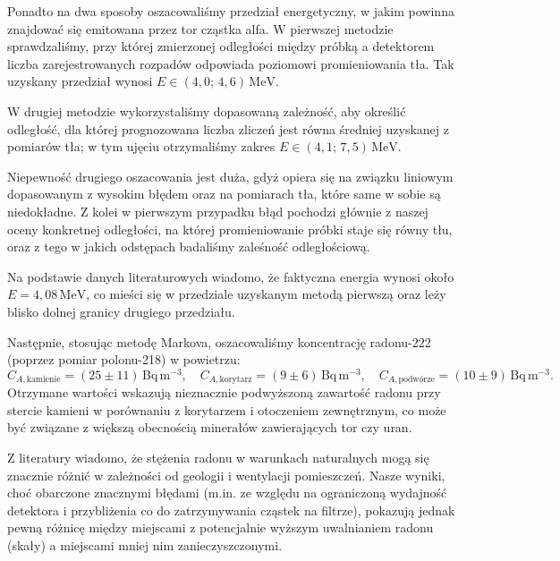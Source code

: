 \documentclass[12pt]{article}
\begin{document}
Ponadto na dwa sposoby oszacowaliśmy przedział energetyczny, w jakim powinna znajdować się emitowana przez tor cząstka alfa. W pierwszej metodzie sprawdzaliśmy, przy której zmierzonej odległości między próbką a detektorem liczba zarejestrowanych rozpadów odpowiada poziomowi promieniowania tła. Tak uzyskany przedział wynosi $E \in (4{,}0;\,4{,}6)\,\mathrm{MeV}$.

W drugiej metodzie wykorzystaliśmy dopasowaną zależność, aby określić odległość, dla której prognozowana liczba zliczeń jest równa średniej uzyskanej z pomiarów tła; w tym ujęciu otrzymaliśmy zakres $E \in (4{,}1;\,7{,}5)\,\mathrm{MeV}$.

Niepewność drugiego oszacowania jest duża, gdyż opiera się na związku liniowym dopasowanym z wysokim błędem oraz na pomiarach tła, które same w sobie są niedokładne. Z kolei w pierwszym przypadku błąd pochodzi głównie z naszej oceny konkretnej odległości, na której promieniowanie próbki staje się równy tłu, oraz z tego w jakich odstępach badaliśmy zaleśność odległościową.

Na podstawie danych literaturowych \cite{alpha_energy} wiadomo, że faktyczna energia wynosi około $E = 4{,}08\,\mathrm{MeV}$, co mieści się w przedziale uzyskanym metodą pierwszą oraz leży blisko dolnej granicy drugiego przedziału.

Następnie, stosując metodę Markova, oszacowaliśmy koncentrację radonu-222 (poprzez pomiar polonu-218) w powietrzu:
\[
	C_{A,\text{kamienie}}=(25 \pm 11)\,\mathrm{Bq\,m^{-3}},
	\quad
	C_{A,\text{korytarz}}=(9 \pm 6)\,\mathrm{Bq\,m^{-3}},
	\quad
	C_{A,\text{podwórze}}=(10 \pm 9)\,\mathrm{Bq\,m^{-3}}.
\]
Otrzymane wartości wskazują nieznacznie podwyższoną zawartość radonu przy stercie kamieni w porównaniu z korytarzem i otoczeniem zewnętrznym, co może być związane z większą obecnością minerałów zawierających tor czy uran.

Z literatury \cite{concentration} wiadomo, że stężenia radonu w warunkach naturalnych mogą się znacznie różnić w zależności od geologii i wentylacji pomieszczeń. Nasze wyniki, choć obarczone znacznymi błędami (m.in. ze względu na ograniczoną wydajność detektora i przybliżenia co do zatrzymywania cząstek na filtrze), pokazują jednak pewną różnicę między miejscami z potencjalnie wyższym uwalnianiem radonu (skały) a miejscami mniej nim zanieczyszczonymi.

\newpage
\end{document}
